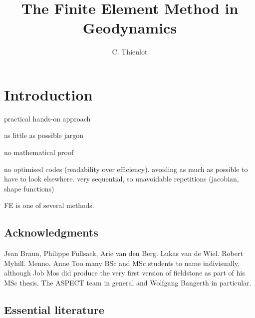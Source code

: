 \documentclass[a4paper]{article}
\title{The Finite Element Method in Geodynamics}
\author{C. Thieulot}
\begin{document}
\maketitle

\tableofcontents

\newpage
\section{Introduction}

practical hands-on approach

as little as possible jargon

no mathematical proof

no optimised codes (readability over efficiency). avoiding as much as possible to have to look elsewhere.
very sequential, so unavoidable repetitions (jacobian, shape functions)

FE is one of several methods.

\subsection{Acknowledgments}

Jean Braun, Philippe Fullsack, Arie van den Berg.
Lukas van de Wiel. Robert Myhill.
Menno, Anne
Too many BSc and MSc students to name indivisually, although Job Mos did produce the
very first version of fieldstone as part of his MSc thesis.
The ASPECT team in general and Wolfgang Bangerth in particular.

\subsection{Essential literature}
\end{document}
